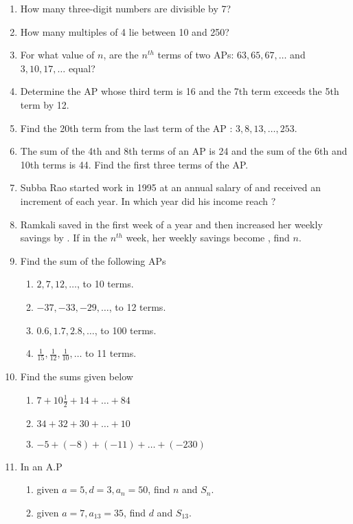 \begin{enumerate}[label=\thesubsection.\arabic*, ref=\thesubsection.\theenumi]
\item How many three-digit numbers are divisible by 7?
\item How many multiples of 4 lie between 10 and 250?
\item For what value of $n$,  are the $n^{th}$ terms of two APs: $63,  65,  67, \dots $  and $3,  10,  17, \dots $  equal?
\item Determine the AP whose third term is 16 and the 7th term exceeds the 5th term by 12.
\item Find the 20th term from the last term of the AP : $3,  8,  13, \dots  ,  253$.
\item The sum of the 4th and 8th terms of an AP is 24 and the sum of the 6th and 10th terms is 44. Find the first three terms of the AP.
\item Subba Rao started work in 1995 at an annual salary of  and received an increment of  each year. In which year did his income reach ?
\item Ramkali saved  in the first week of a year and then increased her weekly savings by . If in the $n^{th}$ week,  her weekly savings become ,  find $n$.
\item Find the sum of the following APs
	\begin{multicols}{2}
\begin{enumerate}
	\item $2,  7,  12,  \dots $,  to 10 terms.
	\item $-37,  -33,  -29,  \dots $,  to 12 terms.
	\item $ 0.6,  1.7,  2.8,  \dots $,  to 100 terms.
	\item $\frac{1}{15},  \frac{1}{12},  \frac{1}{10}, \dots  $ to 11 terms.
\end{enumerate}
\end{multicols}
\item Find the sums given below 
\begin{enumerate}
\item $7+10\frac{1}{2}+14+\dots +84$
\item $34 + 32 + 30 + \dots + 10$
\item $-5 + (-8) + (-11) + \dots + (-230)$
\end{enumerate}
\item In an A.P
\begin{enumerate}
\item given $a = 5,  d = 3,  a_n = 50$,  find $n$ and $S_n$.
\item given $a = 7,  a_{13} = 35$,  find $d$ and $S_{13}$.

\end{enumerate}
\end{enumerate}
